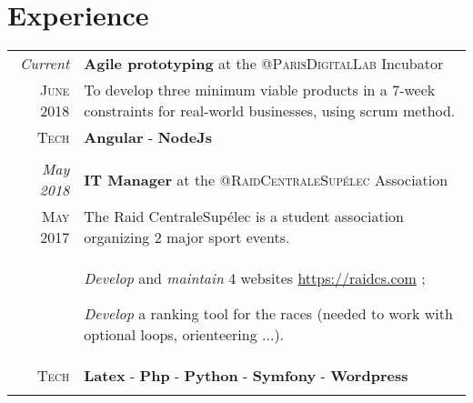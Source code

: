 \documentclass[a4paper,10pt]{article}
\newcommand{\myFonction}[1]{
  \textbf{#1}
}
\newcommand{\tech}[1]{
  \textbf{#1}
}
\begin{document}
\section{Experience}
\begin{tabular}{r|p{15cm}}

  \emph{Current}       & \myFonction{Agile prototyping}at the \textsc{@ParisDigitalLab} Incubator\\
  \textsc{June 2018}  &To develop three minimum viable products in a 7-week constraints for real-world businesses, using scrum method.\\
  \textsc{Tech}       & \tech{Angular} - \tech{NodeJs}\\
  \multicolumn{2}{c}{} \\

  \emph{May 2018}      & \myFonction{IT Manager}at the \textsc{@RaidCentraleSupélec} Association\\
   \textsc{May 2017}  & The Raid CentraleSupélec is a student association organizing 2 major sport events.\\
                      & \vspace{-3mm} \begin{projects}
                          \item \emph{Develop} and \emph{maintain} 4 websites \href{https://raidcs.com}{https://raidcs.com} ;
                          \item \emph{Develop} a ranking tool for the races (needed to work with optional loops, orienteering ...).
                        \end{projects} \vspace{-3mm}\\
  \textsc{Tech}        & \tech{Latex} - \tech{Php} - \tech{Python} - \tech{Symfony} - \tech{Wordpress}\\
  \multicolumn{2}{c}{} \\



\end{tabular}
\end{document}
